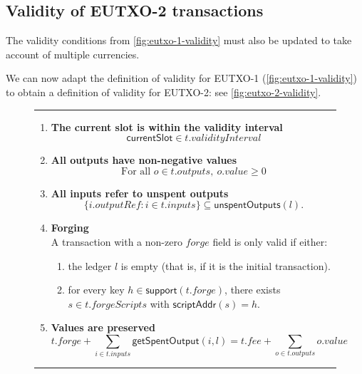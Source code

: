 \documentclass[a4paper]{article}
\renewcommand{\i}{\textit}  %
\newcommand{\msf}[1]{\ensuremath{\mathsf{#1}}}
\newcommand{\mi}[1]{\ensuremath{\mathit{#1}}}
\newcommand\rfskip{7pt}
\newenvironment{ruledfigure}[1]{\begin{figure}[#1]\hrule\vspace{\rfskip}}{\vspace{\rfskip}\hrule\end{figure}}
\newcommand{\support}{\msf{support}}
\newcommand{\scriptAddr}{\msf{scriptAddr}}
\newcommand{\inputs}{\mi{inputs}}
\newcommand{\outputs}{\mi{outputs}}
\newcommand{\forge}{\mi{forge}}
\newcommand{\forgeScripts}{\mi{forgeScripts}}
\newcommand{\fee}{\mi{fee}}
\newcommand{\val}{\mi{value}}  %
\newcommand{\outputref}{\mi{outputRef}}
\newcommand{\getSpent}{\msf{getSpentOutput}}
\newcommand{\unspent}{\msf{unspentOutputs}}
\begin{document}
\subsection{Validity of EUTXO-2 transactions}
\label{sec:eutxo-2-validity}

\bigskip
\noindent The validity conditions from
\cref{fig:eutxo-1-validity} must also be updated to take account
of multiple currencies.

We can now adapt the definition of validity for EUTXO-1
(\cref{fig:eutxo-1-validity}) to obtain a definition of validity for
EUTXO-2: see \cref{fig:eutxo-2-validity}.

\begin{ruledfigure}{H}
\begin{enumerate}

\item
  \label{rule:slot-in-range-2}
  \textbf{The current slot is within the validity interval}
  \begin{displaymath}
    \msf{currentSlot} \in t.\i{validityInterval}
  \end{displaymath}

\item
  \label{rule:all-outputs-are-non-negative-2}
  \textbf{All outputs have non-negative values}
  \begin{displaymath}
    \textrm{For all } o \in t.\outputs,\ o.\val \geq 0
  \end{displaymath}

\item
  \label{rule:all-inputs-refer-to-unspent-outputs-2}
  \textbf{All inputs refer to unspent outputs}
  \begin{displaymath}
    \{i.\outputref: i \in t.\inputs \} \subseteq \unspent(l).
  \end{displaymath}

\item
  \label{rule:forging-2}
  \textbf{Forging}\\
  A transaction with a non-zero \forge{} field is only
  valid if either:
  \begin{enumerate}
    \item the ledger $l$ is empty (that is, if it is the initial transaction).
    \item \label{rule:custom-forge}
      for every key $h \in \support(t.\forge)$, there
      exists $s \in t.\forgeScripts$ with $\scriptAddr(s) = h$.
  \end{enumerate}

\item
  \label{rule:value-is-preserved-2}
  \textbf{Values are preserved}
  \begin{displaymath}
    t.\forge + \sum_{i \in t.\inputs} \getSpent(i, l) = t.\fee + \sum_{o \in t.\outputs} o.\val
  \end{displaymath}


\end{enumerate}
\end{ruledfigure}
\end{document}
